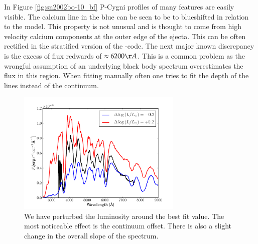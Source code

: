 
In Figure \ref{fig:sn2002bo-10_bf} P-Cygni profiles of many features are easily visible. The calcium line in the blue can be seen to be to blueshifted in relation to the model. This property is not unusual and is thought to come from high velocity calcium components at the outer edge of the ejecta. This can be often rectified in the stratified version of the \mlc-code. The next major known discrepancy is the excess of flux redwards of  $\approx 6200 \AA$.  This is a common problem as the wrongful assumption of an underlying black body spectrum overestimates the flux in this region. When fitting manually often one tries to fit the depth of the lines instead of the continuum.

\begin{figure}[htbp] %
   \centering
   \includegraphics[width=0.7\textwidth]{chapter_dalek/plots/bf2002bo-10_lum.pdf} 
   \caption{We have perturbed the luminosity around the best fit value. The most noticeable effect is the continuum offset. There is also a slight change in the overall slope of the spectrum.} 
   \label{fig:sn2002bo_lum_offset}
\end{figure}

